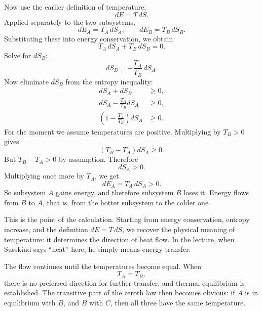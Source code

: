 Now use the earlier definition of temperature,
\begin{equation}
dE=T\,dS.
\end{equation}
Applied separately to the two subsystems,
\begin{equation}
dE_A=T_A\,dS_A,
\qquad
dE_B=T_B\,dS_B.
\end{equation}
Substituting these into energy conservation, we obtain
\begin{equation}
T_A\,dS_A+T_B\,dS_B=0.
\end{equation}
Solve for \(dS_B\):
\begin{equation}
dS_B=-\frac{T_A}{T_B}\,dS_A.
\end{equation}
Now eliminate \(dS_B\) from the entropy inequality:
\begin{align}
dS_A+dS_B &\ge 0, \\
dS_A-\frac{T_A}{T_B}dS_A &\ge 0, \\
\left(1-\frac{T_A}{T_B}\right)dS_A &\ge 0.
\end{align}
For the moment we assume temperatures are positive. Multiplying by \(T_B>0\) gives
\begin{equation}
(T_B-T_A)dS_A\ge 0.
\end{equation}
But \(T_B-T_A>0\) by assumption. Therefore
\begin{equation}
dS_A>0.
\end{equation}
Multiplying once more by \(T_A\), we get
\begin{equation}
dE_A=T_A\,dS_A>0.
\end{equation}
So subsystem \(A\) gains energy, and therefore subsystem \(B\) loses it. Energy flows from \(B\) to \(A\), that is, from the hotter subsystem to the colder one.

This is the point of the calculation. Starting from energy conservation, entropy increase, and the definition \(dE=T\,dS\), we recover the physical meaning of temperature: it determines the direction of heat flow. In the lecture, when Susskind says ``heat'' here, he simply means energy transfer.

The flow continues until the temperatures become equal. When
\begin{equation}
T_A=T_B,
\end{equation}
there is no preferred direction for further transfer, and thermal equilibrium is established. The transitive part of the zeroth law then becomes obvious: if \(A\) is in equilibrium with \(B\), and \(B\) with \(C\), then all three have the same temperature.


